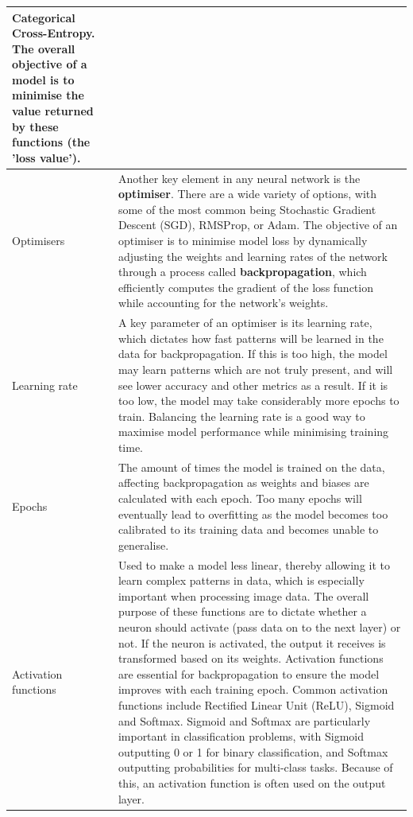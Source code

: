 \documentclass[12pt]{report}
\begin{document}
\begin{longtable}{ | p{} | p{} | }
    Categorical Cross-Entropy. The overall objective of a model is to minimise the value returned by these functions (the 'loss value').  \\
    \hline 
    Optimisers & Another key element in any neural network is the \textbf{optimiser}. There are a wide variety of options,
    with some of the most common being Stochastic Gradient Descent (SGD), RMSProp, or Adam. The objective of an optimiser 
    is to minimise model loss by dynamically adjusting the weights and learning rates of the network through a process called 
    \textbf{backpropagation}, which efficiently computes the gradient of the loss function while accounting for the 
    network's weights. \\
    \hline 
    Learning rate & A key parameter of an optimiser is its learning rate, which dictates how fast patterns will be learned in 
    the data for backpropagation. If this is too high, the model may learn patterns which are not truly present, and will see 
    lower accuracy and other metrics as a result. If it is too low, the model may take considerably more epochs to train.
    Balancing the learning rate is a good way to maximise model performance while minimising training time. \\
    \hline 
    Epochs & The amount of times the model is trained on the data, affecting backpropagation as 
    weights and biases are calculated with each epoch. Too many epochs will eventually lead to 
    overfitting as the model becomes too calibrated to its training data and becomes unable 
    to generalise. \\
    \hline
    Activation functions & Used to make a model 
    less linear, thereby allowing it to learn complex patterns in data, which is especially important when processing image data.
    The overall purpose of these functions are to dictate whether a neuron should activate (pass data on to the next layer) or not.
    If the neuron is activated, the output it receives is transformed based on its weights. Activation functions are essential 
    for backpropagation to ensure the model improves with each training epoch. Common activation functions include Rectified Linear 
    Unit (ReLU), Sigmoid and Softmax. Sigmoid and Softmax are particularly important in classification problems, with Sigmoid 
    outputting 0 or 1 for binary classification, and Softmax outputting probabilities for multi-class tasks. Because of this, an activation 
    function is often used on the output layer.   \\
    \hline 

\end{longtable}
\end{document}
